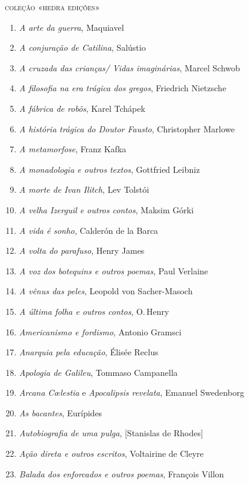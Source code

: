 \pagebreak
\blankpage
\pagestyle{empty}
\begingroup
\fontsize{7}{8}\selectfont

{\large\textsc{coleção «hedra edições»}}

\begin{enumerate}
\setlength\parskip{4.2pt}
\setlength\itemsep{-1.4mm}
\item \textit{A arte da guerra}, Maquiavel
\item \textit{A conjuração de Catilina}, Salústio
\item \textit{A cruzada das crianças/ Vidas imaginárias}, Marcel Schwob
\item \textit{A filosofia na era trágica dos gregos}, Friedrich Nietzsche
\item \textit{A fábrica de robôs}, Karel Tchápek 
\item \textit{A história trágica do Doutor Fausto}, Christopher Marlowe
\item \textit{A metamorfose}, Franz Kafka
\item \textit{A monadologia e outros textos}, Gottfried Leibniz
\item \textit{A morte de Ivan Ilitch}, Lev Tolstói 
\item \textit{A velha Izerguil e outros contos}, Maksim Górki
\item \textit{A vida é sonho}, Calderón de la Barca
\item \textit{A volta do parafuso}, Henry James
\item \textit{A voz dos botequins e outros poemas}, Paul Verlaine 
\item \textit{A vênus das peles}, Leopold von Sacher{}-Masoch
\item \textit{A última folha e outros contos}, O.\,Henry
\item \textit{Americanismo e fordismo}, Antonio Gramsci
\item \textit{Anarquia pela educação}, Élisée Reclus 
\item \textit{Apologia de Galileu}, Tommaso Campanella 
\item \textit{Arcana C\oe lestia} e \textit{Apocalipsis revelata}, Emanuel Swedenborg
\item \textit{As bacantes}, Eurípides
\item \textit{Autobiografia de uma pulga}, [Stanislas de Rhodes]
\item \textit{Ação direta e outros escritos}, Voltairine de Cleyre
\item \textit{Balada dos enforcados e outros poemas}, François Villon

\end{enumerate}

